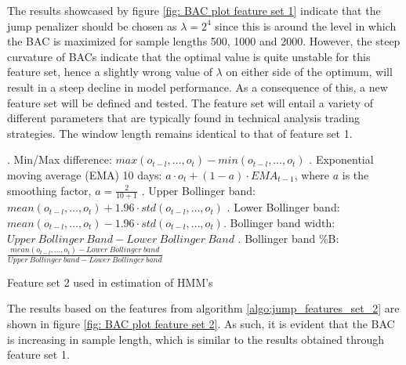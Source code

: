 The results showcased by figure \ref{fig: BAC plot feature set 1} indicate that the jump penalizer should be chosen as $\lambda = 2^4$ since this is around the level in which the BAC is maximized for sample lengths 500, 1000 and 2000. However, the steep curvature of BACs indicate that the optimal value is quite unstable for this feature set, hence a slightly wrong value of $\lambda$ on either side of the optimum, will result in a steep decline in model performance. As a consequence of this, a new feature set will be defined and tested. The feature set will entail a variety of different parameters that are typically found in technical analysis trading strategies. The window length remains identical to that of feature set 1.

\begin{algorithm}[H]
. Min/Max difference: $max(o_{t-l},\ldots,o_{t}) - min(o_{t-l},\ldots,o_{t})$ . Exponential moving average (EMA) 10 days: $a \cdot o_t + (1-a) \cdot EMA_{t-1}$, \quad where $a$ is the smoothing factor, $a = \frac{2}{10+1}$ . Upper Bollinger band: $mean(o_{t-l},\ldots,o_t) + 1.96 \cdot std(o_{t-l},\ldots,o_t)$ . Lower Bollinger band: $mean(o_{t-l},\ldots,o_t) - 1.96 \cdot std(o_{t-l},\ldots,o_t)$. Bollinger band width: $Upper\ Bollinger\ Band - Lower\  Bollinger\ Band$ . Bollinger band \%B: $\frac{mean(o_{t-l},\ldots,o_{t}) - Lower\ Bollinger\ band} {Upper\ Bollinger\ band - Lower\ Bollinger\ band}$  \;
\BlankLine
{}
\caption{Feature set 2 used in \jump estimation of HMM's}
\label{algo:jump_features_set_2}
\end{algorithm}

The results based on the features from algorithm \ref{algo:jump_features_set_2} are shown in figure \ref{fig: BAC plot feature set 2}. As such, it is evident that the BAC is increasing in sample length, which is similar to the results obtained through feature set 1.

